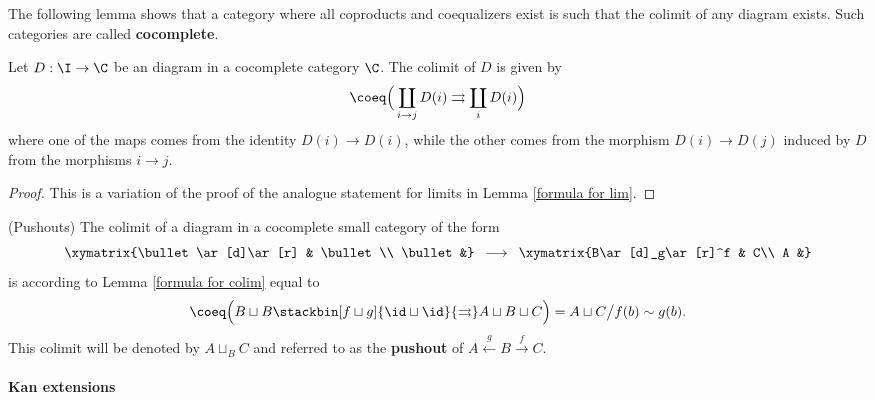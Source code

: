 \documentclass[main.tex]{subfiles}
\begin{document}
The following lemma shows that a category where all coproducts and coequalizers exist is such that the colimit of any diagram exists. Such categories are called \textbf{cocomplete}.

\begin{alemma}\label{formula for colim}
Let $D:\I\to\C$ be an diagram in a cocomplete category $\C$. The colimit of $D$ is given by $$\coeq\Big(\coprod_{i\to j}D(i)\rightrightarrows\coprod_{i}D(i)\Big)$$
where one of the maps comes from the identity $D(i)\to D(i)$, while the other comes from the morphism $D(i)\to D(j)$ induced by $D$ from the morphisms $i\to j$.
\begin{proof}
This is a variation of the proof of the analogue statement for limits in Lemma \ref{formula for lim}.
\end{proof}
\end{alemma}

\begin{aex}(Pushouts)
The colimit of a diagram in a cocomplete small category of the form \vspace*{-10pt}
$$\begin{array}{l}
\xymatrix{\bullet\ar[d]\ar[r] & \bullet \\ \bullet &}
\end{array}\longrightarrow\begin{array}{l}
\xymatrix{B\ar[d]_g\ar[r]^f & C\\ A &}
\end{array}$$
is according to Lemma \ref{formula for colim} equal to $$\coeq\Big(B\sqcup B\stackbin[f\sqcup g]{\id\sqcup\id}{\rightrightarrows}A\sqcup B\sqcup C \Big)=A\sqcup C\big/f(b)\sim g(b).$$
This colimit will be denoted by $A\sqcup_B C$ and referred to as the \textbf{pushout} of $A\stackrel{g}{\leftarrow}B\stackrel{f}{\to}C$.
\end{aex}

\paragraph{Kan extensions}
\end{document}
